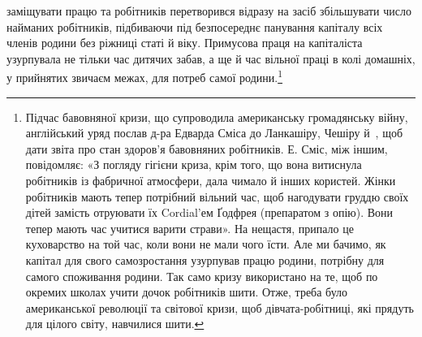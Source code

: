 \parcont{}  %
заміщувати працю та робітників перетворився відразу на засіб
збільшувати число найманих робітників, підбиваючи під безпосереднє
панування капіталу всіх членів родини без ріжниці статі
й віку. Примусова праця на капіталіста узурпувала не тільки час
дитячих забав, а ще й час вільної праці в колі домашніх, у прийнятих
звичаєм межах, для потреб самої родини.\footnote{
Підчас бавовняної кризи, що супроводила американську громадянську
війну, англійський уряд послав д-ра Едварда Сміса до Ланкашіру,
Чешіру й~, щоб дати звіта про стан здоров’я бавовняних робітників.
Е. Сміс, між іншим, повідомляє: «З погляду гігієни криза, крім
того, що вона витиснула робітників із фабричної атмосфери, дала чимало
й інших користей. Жінки робітників мають тепер потрібний вільний
час, щоб нагодувати груддю своїх дітей замість отруювати їх Cordial’ем
Ґодфрея (препаратом з опію). Вони тепер мають час учитися варити страви».
На нещастя, припало це куховарство на той час, коли вони не мали
чого їсти. Але ми бачимо, як капітал для свого самозростання узурпував
працю родини, потрібну для самого споживання родини. Так само кризу
використано на те, щоб по окремих школах учити дочок робітників шити.
Отже, треба було американської революції та світової кризи, щоб дівчата-робітниці,
які прядуть для цілого світу, навчилися шити.
}

